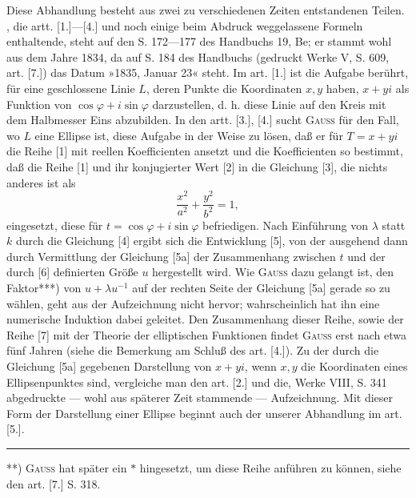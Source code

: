 \begingroup
\clearpage{}
\begin{center}\bfseries{}\end{center}
\par\indent Diese Abhandlung besteht aus zwei zu verschiedenen Zeiten entstandenen Teilen. , die artt. [1.]---[4.] und noch einige beim Abdruck weggelassene Formeln enthaltende, steht auf den S. 172---177 des Handbuchs 19, Be; er stammt wohl aus dem Jahre 1834, da auf S. 184 des Handbuchs (gedruckt Werke V, S. 609, art. [7.]) das Datum »1835, Januar 23« steht. Im art. [1.] ist die Aufgabe berührt, für eine geschlossene Linie $L$, deren Punkte die Koordinaten $x,y$ haben, $x+yi$ als Funktion von $\cos\varphi+i\sin\varphi$ darzustellen, d. h. diese Linie auf den Kreis mit dem Halbmesser Eins abzubilden. In den artt. [3.], [4.] sucht \textsc{Gauss} für den Fall, wo $L$ eine Ellipse ist, diese Aufgabe in der Weise zu lösen, daß er für $T=x+yi$ die Reihe [1] mit reellen Koefficienten ansetzt und die Koefficienten so bestimmt, daß die Reihe [1] und ihr konjugierter Wert [2] in die Gleichung [3], die nichts anderes ist als
\[\frac{x^2}{a^2}+\frac{y^2}{b^2}=1,\]
\noindent eingesetzt, diese für $t=\cos\varphi+i\sin\varphi$ befriedigen. Nach Einführung von $\lambda$ statt $k$ durch die Gleichung [4] ergibt sich die Entwicklung [5], von der ausgehend dann durch Vermittlung der Gleichung [5a] der Zusammenhang zwischen $t$ und der durch [6] definierten Größe $u$ hergestellt wird. Wie \textsc{Gauss} dazu gelangt ist, den Faktor***) von $u+\lambda u^{-1}$ auf der rechten Seite der Gleichung [5a] gerade so zu wählen, geht aus der Aufzeichnung nicht hervor; wahrscheinlich hat ihn eine numerische Induktion dabei geleitet. Den Zusammenhang dieser Reihe, sowie der Reihe [7] mit der Theorie der elliptischen Funktionen findet \textsc{Gauss} erst nach etwa fünf Jahren (siehe die Bemerkung am Schluß des art. [4.]). Zu der durch die Gleichung [5a] gegebenen Darstellung von $x+yi$, wenn $x,y$ die Koordinaten eines Ellipsenpunktes sind, vergleiche man den art. [2.] und die, Werke VIII, S. 341 abgedruckte --- wohl aus späterer Zeit stammende --- Aufzeichnung. Mit dieser Form der Darstellung einer Ellipse beginnt auch der  unserer Abhandlung im art. [5.].
\par\bigskip\noindent\rule{.25\linewidth}{.4pt}\par\smallskip
{\small\par\indent ***) \textsc{Gauss} hat später ein $\ast$ hingesetzt, um diese Reihe anführen zu können, siehe den art. [7.] S. 318.\par}
